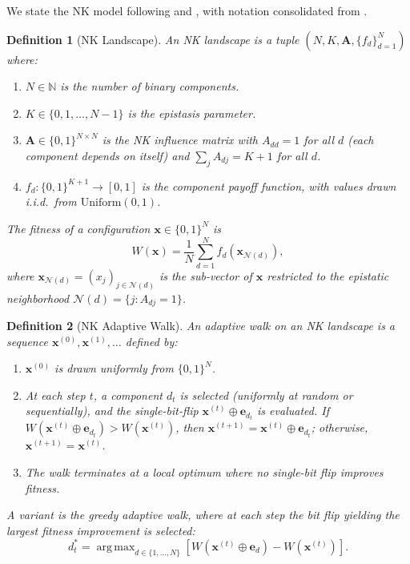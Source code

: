 \documentclass[12pt]{article}
\newtheorem{definition}{Definition}
\DeclareMathOperator*{\argmax}{arg\,max}
\newcommand{\N}{\mathbb{N}}
\newcommand{\bx}{\mathbf{x}}
\newcommand{\be}{\mathbf{e}}
\newcommand{\bA}{\mathbf{A}}
\begin{document}
We state the NK model following \citet{kauffman1993origins} and
\citet{levinthal1997adaptation}, with notation consolidated from
\citet{altenberg1997nk}.

\begin{definition}[NK Landscape]
\label{def:nk}
An \emph{NK landscape} is a tuple $(N, K, \bA, \{f_d\}_{d=1}^N)$ where:
\begin{enumerate}[label=(\roman*)]
  \item $N \in \N$ is the number of binary components.
  \item $K \in \{0, 1, \ldots, N-1\}$ is the epistasis parameter.
  \item $\bA \in \{0,1\}^{N \times N}$ is the NK influence matrix with
        $A_{dd} = 1$ for all $d$ (each component depends on itself) and
        $\sum_{j} A_{dj} = K+1$ for all $d$.
  \item $f_d : \{0,1\}^{K+1} \to [0,1]$ is the component payoff function,
        with values drawn i.i.d.\ from $\mathrm{Uniform}(0,1)$.
\end{enumerate}
The fitness of a configuration $\bx \in \{0,1\}^N$ is
\begin{equation}
\label{eq:nk_fitness}
  W(\bx) = \frac{1}{N} \sum_{d=1}^{N} f_d\!\left(\bx_{\mathcal{N}(d)}\right),
\end{equation}
where $\bx_{\mathcal{N}(d)} = (x_j)_{j \in \mathcal{N}(d)}$ is the sub-vector of
$\bx$ restricted to the epistatic neighborhood $\mathcal{N}(d) = \{j : A_{dj}=1\}$.
\end{definition}

\begin{definition}[NK Adaptive Walk]
\label{def:nk_walk}
An \emph{adaptive walk} on an NK landscape is a sequence
$\bx^{(0)}, \bx^{(1)}, \ldots$ defined by:
\begin{enumerate}[label=(\roman*)]
  \item $\bx^{(0)}$ is drawn uniformly from $\{0,1\}^N$.
  \item At each step $t$, a component $d_t$ is selected (uniformly at random or
        sequentially), and the single-bit-flip
        $\bx^{(t)} \oplus \be_{d_t}$ is evaluated. If
        $W(\bx^{(t)} \oplus \be_{d_t}) > W(\bx^{(t)})$, then
        $\bx^{(t+1)} = \bx^{(t)} \oplus \be_{d_t}$; otherwise,
        $\bx^{(t+1)} = \bx^{(t)}$.
  \item The walk terminates at a local optimum where no single-bit flip
        improves fitness.
\end{enumerate}
A variant is the \emph{greedy adaptive walk}, where at each step the bit
flip yielding the largest fitness improvement is selected:
\begin{equation}
\label{eq:nk_greedy}
  d_t^* = \argmax_{d \in \{1,\ldots,N\}}
    \left[W\!\left(\bx^{(t)} \oplus \be_d\right) - W\!\left(\bx^{(t)}\right)\right].
\end{equation}
\end{definition}
\end{document}
